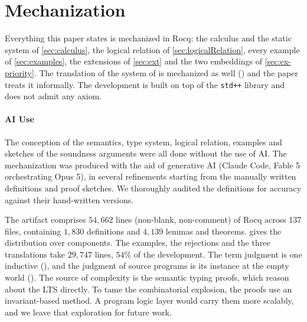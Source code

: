 
\section{Mechanization}
\label{sec:mechanization}

Everything this paper states is mechanized in Rocq: the calculus and the
static system of \cref{sec:calculus}, the logical relation of
\cref{sec:logicalRelation}, every example of \cref{sec:examples}, the
extensions of \cref{sec:ext} and the two embeddings of
\cref{sec:ex-priority}.
The translation of the system of
\citet{MordidoP} is mechanized as well ()
and the paper treats it informally.
The development is built on top of the
\texttt{std++} library and does not admit any axiom.

\paragraph{AI Use}
The conception of the semantics, type system, logical relation, examples and sketches of the soundness arguments were all done without the use of AI.
The mechanization was produced with the aid of generative AI
(Claude Code, Fable 5 orchestrating Opus 5),
in several refinements starting from the manually written definitions and proof sketches.
We thoroughly audited the definitions for accuracy against their hand-written versions.

The artifact comprises $54{,}662$ lines (non-blank, non-comment) of Rocq
across 137 files, containing $1{,}830$ definitions and $4{,}139$ lemmas
and theorems.
 gives the distribution over components.
The examples, the rejections and the three translations take
$29{,}747$ lines, $54\%$ of the development. The term judgment is one
inductive (), and the judgment of source programs is its
instance at the empty world ().
The source of complexity is the semantic typing proofs, which reason about
the LTS directly. To tame the combinatorial explosion, the proofs use an
invariant-based method. A program logic layer would carry them more
scalably, and we leave that exploration for future work.

